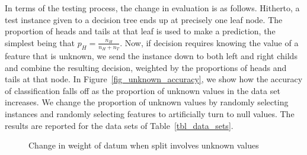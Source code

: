 In terms of the testing process, the change in evaluation is as follows.
Hitherto, a test instance given to a decision tree ends up at precisely one leaf
node. The proportion of heads and tails at that leaf is used to make a
prediction, the simplest being that \(p_H = \frac{n_H}{n_H+n_T}\). Now, if
decision requires knowing the value of a feature that is unknown, we send the
instance down to both left and right childs and combine the resulting decision,
weighted by the proportions of heads and tails at that node. In
Figure~\ref{fig_unknown_accuracy}, we show how the accuracy of classification
falls off as the proportion of unknown values in the data set increases. We
change the proportion of unknown values by randomly selecting instances and
randomly selecting features to artificially turn to null values. The results are
reported for the data sets of Table~\ref{tbl_data_sets}.


\begin{figure}
\centering
{}
\label{fig_unknown_values}
\caption{Change in weight of datum when split involves unknown values}
\end{figure}






